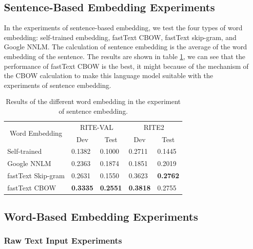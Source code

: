 \documentclass[12pt]{article}
\begin{document}
\begin{CJK*}{UTF8}{bkai}
\begin{spacing}{1.77}
\subsection{Sentence-Based Embedding Experiments}
In the experiments of sentence-based embedding, we test the four types of word embedding: self-trained embedding, fastText CBOW, fastText skip-gram, and Google NNLM. The calculation of sentence embedding is the average of the word embedding of the sentence. The results are shown in table \ref{result:sent_emb_nnlm}, we can see that the performance of fastText CBOW is the best, it might because of the mechanism of the CBOW calculation to make this language model suitable with the experiments of sentence embedding.

\begin{table}[H]
  \centering
  \setlength{\extrarowheight}{-3pt}
  \caption{Results of the different word embedding in the experiment of sentence embedding.}
  \label{result:sent_emb_nnlm}
  \begin{tabular}{|l|l|l|l|l|}
  \hline
  \multicolumn{1}{|c|}{\multirow{2}{*}{Word   Embedding}} & \multicolumn{2}{c|}{RITE-VAL} & \multicolumn{2}{c|}{RITE2} \\ \cline{2-5}
  \multicolumn{1}{|c|}{} & \multicolumn{1}{c|}{Dev} & \multicolumn{1}{c|}{Test} & \multicolumn{1}{c|}{Dev} & \multicolumn{1}{c|}{Test} \\ \hline
  Self-trained & 0.1382 & 0.1000 & 0.2711 & 0.1445 \\ \hline
  Google NNLM & 0.2363 & 0.1874 & 0.1851 & 0.2019 \\ \hline
  fastText Skip-gram & 0.2631 & 0.1550 & 0.3623 & \textbf{0.2762} \\ \hline
  fastText CBOW & \textbf{0.3335} & \textbf{0.2551} & \textbf{0.3818} & 0.2755 \\ \hline
  \end{tabular}
\end{table}

\subsection{Word-Based Embedding Experiments}
\subsubsection{Raw Text Input Experiments}

\end{spacing}
\end{CJK*}
\end{document}
